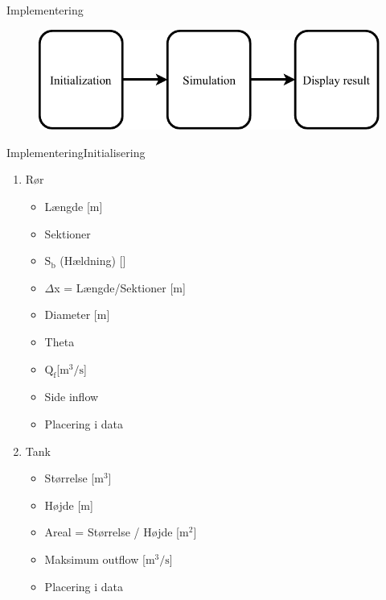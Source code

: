 \begin{frame}{Implementering}{}
 \vfill\vfill\centering  
\begin{figure}[H]
\centering
\includegraphics[width=0.75 \textwidth]{figures/Basic_implementation}
\label{fig:Basic_Implementering}
\end{figure}
 \vfill\vfill

\end{frame}
\begin{frame}{Implementering}{Initialisering}
    
\begin{table}[H]
\begin{enumerate} 
	\item Rør
	\begin{itemize}
		\item Længde [m]
		\item Sektioner 
		\item $\text{S}_\text{b}$ (Hældning) [\textperthousand]
		\item $\Delta$x = Længde/Sektioner [m]
		\item Diameter [m]
		\item Theta 
		\item $\text{Q}_{\text{f}}$[$\text{m}^\text{3}/\text{s}$]
		\item Side inflow  
		\item Placering i data 
	\end{itemize}
	\item Tank
	\begin{itemize}
		\item Størrelse [$\text{m}^\text{3}$]
		\item Højde [m]
		\item Areal = Størrelse / Højde [$\text{m}^\text{2}$]
		\item Maksimum outflow [$\text{m}^\text{3}/\text{s}$]
		\item Placering i data 
	\end{itemize}
	
\end{enumerate}
\label{tab:init_list}
\end{table}

\end{frame}


